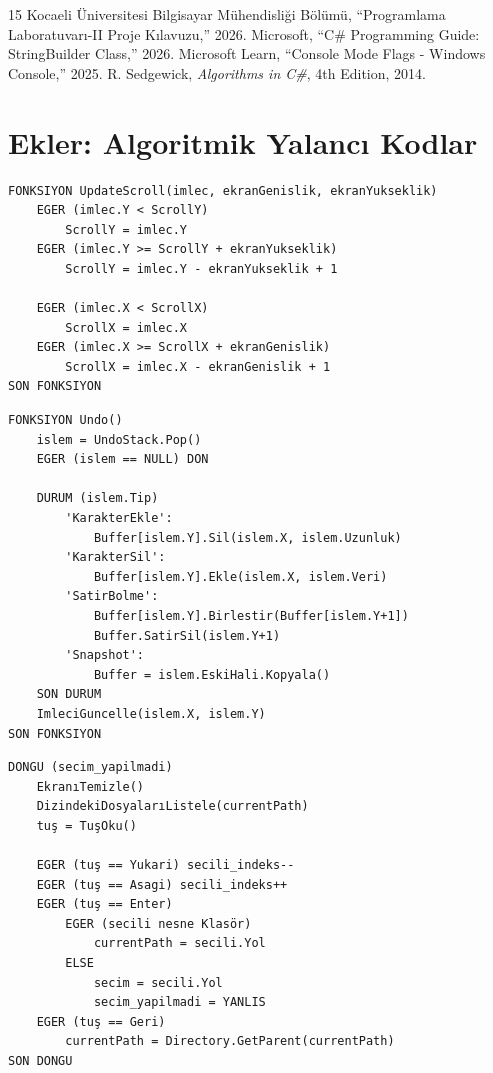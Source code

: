 \documentclass[12pt, conference]{IEEEtran}
\begin{document}
\begin{thebibliography}{15}
 Kocaeli Üniversitesi Bilgisayar Mühendisliği Bölümü, ``Programlama Laboratuvarı-II Proje Kılavuzu,'' 2026.
 Microsoft, ``C\# Programming Guide: StringBuilder Class,'' 2026.
 Microsoft Learn, ``Console Mode Flags - Windows Console,'' 2025.
 R. Sedgewick, \emph{Algorithms in C\#}, 4th Edition, 2014.
\end{thebibliography}

\newpage
\section*{Ekler: Algoritmik Yalancı Kodlar}

\begin{lstlisting}[caption=Sanal Kaydırma ve Viewport Güncelleme]
FONKSIYON UpdateScroll(imlec, ekranGenislik, ekranYukseklik)
    EGER (imlec.Y < ScrollY)
        ScrollY = imlec.Y
    EGER (imlec.Y >= ScrollY + ekranYukseklik)
        ScrollY = imlec.Y - ekranYukseklik + 1
        
    EGER (imlec.X < ScrollX)
        ScrollX = imlec.X
    EGER (imlec.X >= ScrollX + ekranGenislik)
        ScrollX = imlec.X - ekranGenislik + 1
SON FONKSIYON
\end{lstlisting}

\begin{lstlisting}[caption=Geri Alma (Undo) Algoritması]
FONKSIYON Undo()
    islem = UndoStack.Pop()
    EGER (islem == NULL) DON
    
    DURUM (islem.Tip)
        'KarakterEkle':
            Buffer[islem.Y].Sil(islem.X, islem.Uzunluk)
        'KarakterSil':
            Buffer[islem.Y].Ekle(islem.X, islem.Veri)
        'SatirBolme':
            Buffer[islem.Y].Birlestir(Buffer[islem.Y+1])
            Buffer.SatirSil(islem.Y+1)
        'Snapshot':
            Buffer = islem.EskiHali.Kopyala()
    SON DURUM
    ImleciGuncelle(islem.X, islem.Y)
SON FONKSIYON
\end{lstlisting}

\begin{lstlisting}[caption=Dosya Gezgini Gezinme Mantığı]
DONGU (secim_yapilmadi)
    EkranıTemizle()
    DizindekiDosyalarıListele(currentPath)
    tuş = TuşOku()
    
    EGER (tuş == Yukari) secili_indeks--
    EGER (tuş == Asagi) secili_indeks++
    EGER (tuş == Enter)
        EGER (secili nesne Klasör)
            currentPath = secili.Yol
        ELSE
            secim = secili.Yol
            secim_yapilmadi = YANLIS
    EGER (tuş == Geri)
        currentPath = Directory.GetParent(currentPath)
SON DONGU
\end{lstlisting}
\end{document}

